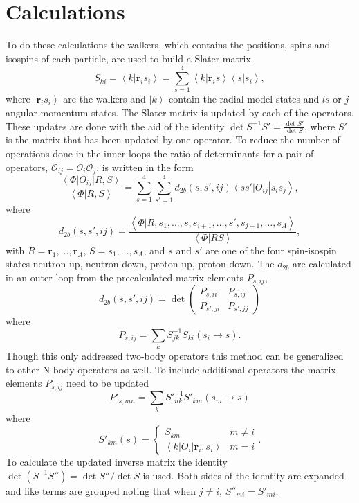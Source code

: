 \documentclass[aps,prl,reprint,superscriptaddress]{revtex4-1}
\newcommand{\ket}[1]{\left| #1 \right>}
\newcommand{\bra}[1]{\left< #1 \right|}
\newcommand{\braket}[2]{\left< #1 | #2 \right>}
\renewcommand{\r}{\mathbf{r}}
\begin{document}
\section{Calculations}
To do these calculations the walkers, which contains the positions, spins and isospins of each particle, are used to build a Slater matrix
\begin{equation}
   S_{ki} = \braket{k}{\r_i s_i} = \sum\limits_{s=1}^4\braket{k}{\r_i s}\braket{s}{s_i},
\end{equation}
where $\ket{\r_i s_i}$ are the walkers and $\ket{k}$ contain the radial model states and $ls$ or $j$ angular momentum states. The Slater matrix is updated by each of the operators. These updates are done with the aid of the identity $\det S^{-1}S' = \frac{\det S'}{\det S}$, where $S'$ is the matrix that has been updated by one operator. To reduce the number of operations done in the inner loops the ratio of determinants for a pair of operators, $\mathcal{O}_{ij}=\mathcal{O}_i\mathcal{O}_j$, is written in the form
\begin{equation}
   \frac{\bra{\Phi}O_{ij}\ket{R,S}}{\braket{\Phi}{R,S}} = \sum\limits_{s=1}^4\sum\limits_{s'=1}^4 d_{2b}(s,s',ij)\bra{ss'}O_{ij}\ket{s_is_j},
\end{equation}
where
\begin{equation}
   d_{2b}(s,s',ij)=\frac{\braket{\Phi}{R,s_1,\ldots,s,s_{i+1},\ldots,s',s_{j+1},\ldots,s_A}}{\braket{\Phi}{RS}},
\end{equation}
with $R=\r_1,\ldots,\r_A$, $S=s_1,\ldots,s_A$, and $s$ and $s'$ are one of the four spin-isospin states neutron-up, neutron-down, proton-up, proton-down. The $d_{2b}$ are calculated in an outer loop from the precalculated matrix elements $P_{s,ij}$,
\begin{equation}
   d_{2b}(s,s',ij) = \det\begin{pmatrix}P_{s,ii} & P_{s,ij} \\ P_{s',ji} & P_{s',jj}\end{pmatrix}
\end{equation}
where
\begin{equation}
   P_{s,ij}=\sum\limits_k S^{-1}_{jk}S_{ki}(s_i\rightarrow s).
\end{equation}
Though this only addressed two-body operators this method can be generalized to other N-body operators as well. To include additional operators the matrix elements $P_{s,ij}$ need to be updated
\begin{equation}
   P'_{s,mn}=\sum\limits_k S'^{-1}_{nk}S'_{km}(s_m\rightarrow s)
\end{equation}
where
\begin{equation}
   S'_{km}(s) = \left\{
   \begin{array}{cc}
      S_{km} & m \ne i\\
      \bra{k}O_i\ket{\r_i,s_i} & m = i
   \end{array}.
   \right.
\end{equation}
To calculate the updated inverse matrix the identity $\det(S^{-1}S'')=\det S''/\det S$ is used. Both sides of the identity are expanded and like terms are grouped noting that when $j \ne i$, $S''_{mi}=S'_{mi}$.
\end{document}
